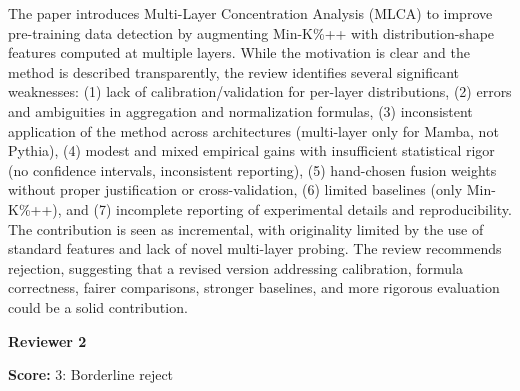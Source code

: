 \begin{tcolorbox}[
    colback=white,
    colframe=black!70,
    title=Reviewer Comments,
    breakable=true,
    fonttitle=\bfseries
]
The paper introduces Multi-Layer Concentration Analysis (MLCA) to improve pre-training data detection by augmenting Min-K\%++ with distribution-shape features computed at multiple layers. While the motivation is clear and the method is described transparently, the review identifies several significant weaknesses: (1) lack of calibration/validation for per-layer distributions, (2) errors and ambiguities in aggregation and normalization formulas, (3) inconsistent application of the method across architectures (multi-layer only for Mamba, not Pythia), (4) modest and mixed empirical gains with insufficient statistical rigor (no confidence intervals, inconsistent reporting), (5) hand-chosen fusion weights without proper justification or cross-validation, (6) limited baselines (only Min-K\%++), and (7) incomplete reporting of experimental details and reproducibility. The contribution is seen as incremental, with originality limited by the use of standard features and lack of novel multi-layer probing. The review recommends rejection, suggesting that a revised version addressing calibration, formula correctness, fairer comparisons, stronger baselines, and more rigorous evaluation could be a solid contribution.

\end{tcolorbox}



\textbf{Reviewer 2}
\begin{tcolorbox}[
    colback=gray!5,
    colframe=gray!60,
    title=Review Score,
    fonttitle=\bfseries
]
\textbf{Score:} 3: Borderline reject
\end{tcolorbox}

